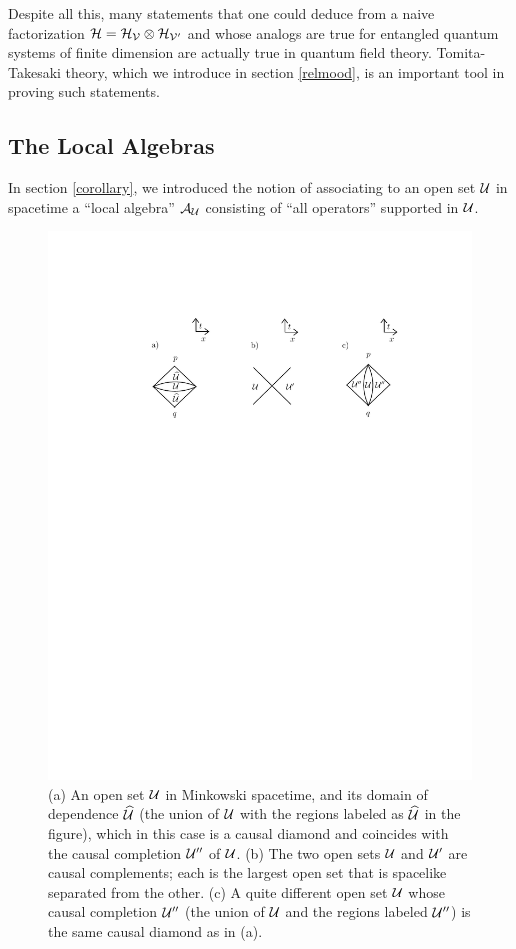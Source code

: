 \documentclass[12pt]{article}
\def\h{\widehat}
\numberwithin{equation}{section}
\def\A{{\mathcal A}}
\begin{document}
Despite all this, many statements that one could deduce from a naive factorization ${\mathcal H}={\mathcal H}_{\mathcal V}\otimes {\mathcal H}_{{\mathcal V}'}$ and whose analogs
are true for entangled quantum systems of finite dimension are actually true in quantum field theory.  
Tomita-Takesaki theory, which we introduce in section \ref{relmood}, is an important tool in proving such statements.

\subsection{The Local Algebras}\label{furtherp}

In section \ref{corollary}, we introduced the notion of associating to an open set ${\mathcal U}$ in spacetime a ``local algebra'' $\A_\U$
consisting of ``all operators'' supported in ${\mathcal U}$.

\begin{figure}
 \begin{center}
   \includegraphics[width=5.5in]{Fig1a.pdf}
 \end{center}
\caption{\small (a) An open set ${\mathcal U}$ in Minkowski spacetime, and its domain of dependence $\h\U$ (the union of ${\mathcal U}$ with the
regions labeled as $\h\U$ in the figure), which in this
case is a causal diamond and coincides with the causal completion ${\mathcal U}''$ of ${\mathcal U}$. (b) The two open sets ${\mathcal U}$ and ${\mathcal U}'$
are causal complements; each is the largest open set that is spacelike separated from the other.  (c) A quite different open set  ${\mathcal U}$ whose
causal completion  ${\mathcal U}''$ (the union of ${\mathcal U}$ and the regions labeled ${\mathcal U}''$) is the same causal diamond as in (a).  \label{Fig1.5}}
\end{figure}
\end{document}
